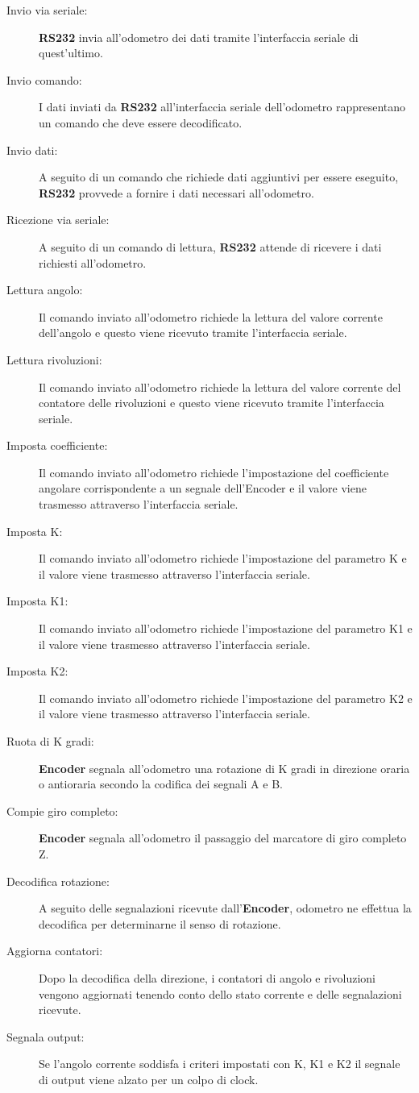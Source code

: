 \documentclass [11pt,a4paper,oneside]{article}
\newcommand{\actor}[1]{\textbf{#1}}
\begin{document}
\begin{description}
\item[Invio via seriale:] \actor{RS232} invia all'odometro dei dati tramite l'interfaccia
     seriale di quest'ultimo.
\item[Invio comando:] I dati inviati da \actor{RS232} all'interfaccia seriale dell'odometro
     rappresentano un comando che deve essere decodificato.
\item[Invio dati:] A seguito di un comando che richiede dati aggiuntivi per essere
     eseguito, \actor{RS232} provvede a fornire i dati necessari all'odometro.
\item[Ricezione via seriale:] A seguito di un comando di lettura, \actor{RS232} attende di
     ricevere i dati richiesti all'odometro.
\item[Lettura angolo:] Il comando inviato all'odometro richiede la lettura del
     valore corrente dell'angolo e questo viene ricevuto tramite l'interfaccia
     seriale.
\item[Lettura rivoluzioni:] Il comando inviato all'odometro richiede la lettura del
     valore corrente del contatore delle rivoluzioni e questo viene ricevuto
     tramite l'interfaccia seriale.
\item[Imposta coefficiente:] Il comando inviato all'odometro richiede l'impostazione
     del coefficiente angolare corrispondente a un segnale dell'Encoder e il valore
     viene trasmesso attraverso l'interfaccia seriale.
\item[Imposta K:] Il comando inviato all'odometro richiede l'impostazione del
     parametro K e il valore viene trasmesso attraverso l'interfaccia seriale.
\item[Imposta K1:] Il comando inviato all'odometro richiede l'impostazione del
     parametro K1 e il valore viene trasmesso attraverso l'interfaccia seriale.
\item[Imposta K2:] Il comando inviato all'odometro richiede l'impostazione del
     parametro K2 e il valore viene trasmesso attraverso l'interfaccia seriale.

\item[Ruota di K gradi:] \actor{Encoder} segnala all'odometro una rotazione di
     K gradi in direzione oraria o antioraria secondo la codifica dei segnali A e B.
\item[Compie giro completo:] \actor{Encoder} segnala all'odometro il passaggio del
     marcatore di giro completo Z.
\item[Decodifica rotazione:] A seguito delle segnalazioni ricevute
     dall'\actor{Encoder}, odometro ne effettua la decodifica per determinarne
     il senso di rotazione.
\item[Aggiorna contatori:] Dopo la decodifica della direzione, i contatori di
     angolo e rivoluzioni vengono aggiornati tenendo conto dello stato corrente
     e delle segnalazioni ricevute.
\item[Segnala output:] Se l'angolo corrente soddisfa i criteri impostati con K, 
     K1 e K2 il segnale di output viene alzato per un colpo di clock.
\end{description}
\end{document}
